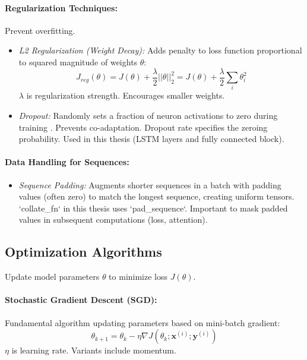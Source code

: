 \begin{appendices}
  \paragraph{Regularization Techniques:} Prevent overfitting.
  \begin{itemize}
    \item \textit{L2 Regularization (Weight Decay):} Adds penalty to loss function proportional to squared magnitude of weights \( \theta \):
          \begin{equation}
            J_{reg}(\theta) = J(\theta) + \frac{\lambda}{2} ||\theta||_2^2 = J(\theta) + \frac{\lambda}{2} \sum_i \theta_i^2 %
          \end{equation}
          \( \lambda \) is regularization strength. Encourages smaller weights.
    \item \textit{Dropout:} Randomly sets a fraction of neuron activations to zero during training \autocite{srivastava2014dropout}. Prevents co-adaptation. Dropout rate specifies the zeroing probability. Used in this thesis (LSTM layers and fully connected block).
  \end{itemize}

  \paragraph{Data Handling for Sequences:}
  \begin{itemize}
    \item \textit{Sequence Padding:} Augments shorter sequences in a batch with padding values (often zero) to match the longest sequence, creating uniform tensors. `collate_fn` in this thesis uses `pad_sequence`. Important to mask padded values in subsequent computations (loss, attention).
  \end{itemize}


  \subsection{Optimization Algorithms}
  \label{subsec:optimization_app} %
  Update model parameters \( \theta \) to minimize loss \( J(\theta) \).

  \paragraph{Stochastic Gradient Descent (SGD):}
  Fundamental algorithm updating parameters based on mini-batch gradient:
  \begin{equation}
    \theta_{k+1} = \theta_k - \eta \nabla J(\theta_k; \bm{x}^{(i)}; \bm{y}^{(i)}) %
  \end{equation}
  \( \eta \) is learning rate. Variants include momentum.


\end{appendices}
